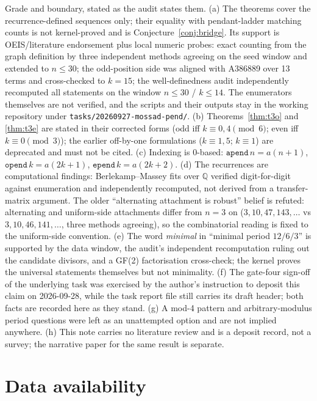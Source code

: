 \documentclass[11pt]{article}
\theoremstyle{definition}
\begin{document}
Grade and boundary, stated as the audit states them. (a) The theorems cover the
recurrence-defined sequences only; their equality with pendant-ladder matching
counts is not kernel-proved and is Conjecture~\ref{conj:bridge}. Its support is
OEIS/literature endorsement plus local numeric probes: exact counting from the
graph definition by three independent methods agreeing on the seed window and
extended to $n\le 30$; the odd-position side was aligned with A386889 over 13
terms and cross-checked to $k=15$; the well-definedness audit independently
recomputed all statements on the window $n\le 30$ / $k\le 14$. The enumerators
themselves are not verified, and the scripts and their outputs stay in the
working repository under \texttt{tasks/20260927-mossad-pend/}. (b)
Theorems~\ref{thm:t3o} and \ref{thm:t3e} are stated in their corrected forms
(odd iff $k\equiv 0,4 \pmod 6$; even iff $k\equiv 0 \pmod 3$); the earlier
off-by-one formulations ($k\equiv 1,5$; $k\equiv 1$) are deprecated and must
not be cited. (c) Indexing is $0$-based: $\mathtt{apend}\,n=a(n+1)$,
$\mathtt{opend}\,k=a(2k+1)$, $\mathtt{epend}\,k=a(2k+2)$. (d) The recurrences
are computational findings: Berlekamp--Massey fits over $\mathbb{Q}$ verified
digit-for-digit against enumeration and independently recomputed, not derived
from a transfer-matrix argument. The older ``alternating attachment is robust''
belief is refuted: alternating and uniform-side attachments differ from $n=3$
on ($3,10,47,143,\dots$ vs $3,10,46,141,\dots$, three methods agreeing), so the
combinatorial reading is fixed to the uniform-side convention. (e) The word
\emph{minimal} in ``minimal period $12/6/3$'' is supported by the data window,
the audit's independent recomputation ruling out the candidate divisors, and a
GF(2) factorisation cross-check; the kernel proves the universal statements
themselves but not minimality. (f) The gate-four sign-off of the underlying
task was exercised by the author's instruction to deposit this claim on
2026-09-28, while the task report file still carries its draft header; both
facts are recorded here as they stand. (g) A mod-4 pattern and
arbitrary-modulus period questions were left as an unattempted option and are
not implied anywhere. (h) This note carries no literature review and is a
deposit record, not a survey; the narrative paper for the same result is
separate.

\section*{Data availability}
\end{document}
